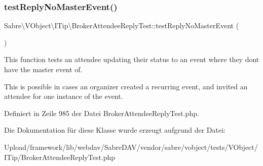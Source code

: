 \mbox{\label{class_sabre_1_1_v_object_1_1_i_tip_1_1_broker_attendee_reply_test_a6a06c746e891ba375d68e9c36e4bc2d8}} 
\subsubsection{\texorpdfstring{test\+Reply\+No\+Master\+Event()}{testReplyNoMasterEvent()}}
{\footnotesize\ttfamily Sabre\textbackslash{}\+V\+Object\textbackslash{}\+I\+Tip\textbackslash{}\+Broker\+Attendee\+Reply\+Test\+::test\+Reply\+No\+Master\+Event (\begin{DoxyParamCaption}{ }\end{DoxyParamCaption})}

This function tests an attendee updating their status to an event where they don\textquotesingle{}t have the master event of.

This is possible in cases an organizer created a recurring event, and invited an attendee for one instance of the event. 

Definiert in Zeile 985 der Datei Broker\+Attendee\+Reply\+Test.\+php.



Die Dokumentation für diese Klasse wurde erzeugt aufgrund der Datei\+:\begin{DoxyCompactItemize}
\item 
Upload/framework/lib/webdav/\+Sabre\+D\+A\+V/vendor/sabre/vobject/tests/\+V\+Object/\+I\+Tip/Broker\+Attendee\+Reply\+Test.\+php\end{DoxyCompactItemize}

